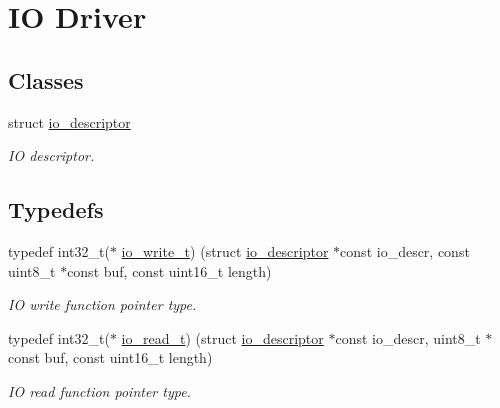 \hypertarget{group__doc__driver__hal__helper__io}{}\section{IO Driver}
\label{group__doc__driver__hal__helper__io}
\subsection*{Classes}
\begin{DoxyCompactItemize}
\item 
struct \hyperlink{structio__descriptor}{io\+\_\+descriptor}
\begin{DoxyCompactList}\small\item\em IO descriptor. \end{DoxyCompactList}\end{DoxyCompactItemize}
\subsection*{Typedefs}
\begin{DoxyCompactItemize}
\item 
typedef int32\+\_\+t($\ast$ \hyperlink{group__doc__driver__hal__helper__io_gacb03c48993a6786f00946c196c40add1}{io\+\_\+write\+\_\+t}) (struct \hyperlink{structio__descriptor}{io\+\_\+descriptor} $\ast$const io\+\_\+descr, const uint8\+\_\+t $\ast$const buf, const uint16\+\_\+t length)
\begin{DoxyCompactList}\small\item\em IO write function pointer type. \end{DoxyCompactList}\item 
typedef int32\+\_\+t($\ast$ \hyperlink{group__doc__driver__hal__helper__io_ga4d9ae58de2887289fe09eac6f0aa8be7}{io\+\_\+read\+\_\+t}) (struct \hyperlink{structio__descriptor}{io\+\_\+descriptor} $\ast$const io\+\_\+descr, uint8\+\_\+t $\ast$const buf, const uint16\+\_\+t length)
\begin{DoxyCompactList}\small\item\em IO read function pointer type. \end{DoxyCompactList}\end{DoxyCompactItemize}
